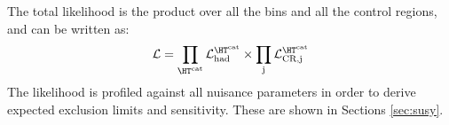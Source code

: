 The total likelihood is the product over all the \htcat bins and all the control regions, and can be written as:
\begin{equation}
\label{eq:total_likelihood}
\mathcal{L} = \prod_{\htcat} \mathcal{L}_{\text{had}}^{\htcat} \times \prod_{\text{j}} \mathcal{L}_{\text{CR,j}}^{\htcat}
\end{equation}
The likelihood is profiled against all nuisance parameters in order to derive expected exclusion limits and sensitivity. 
These are shown in Sections \ref{sec:susy}. 




